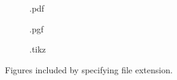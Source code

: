 \begin{figure}
\begin{subfigure}[t]{0.49\textwidth}
        \caption{.pdf}
        \label{figures:fig:exmaple:2:pdf}
        \end{subfigure}
        \begin{subfigure}[t]{0.49\textwidth}
        \caption{.pgf}
        \label{figures:fig:exmaple:2:pgf}
         \end{subfigure} 
        \hfill     
        \begin{subfigure}[t]{0.49\textwidth}
        \caption{.tikz}
        \label{figures:fig:exmaple:2:tikz}
        \end{subfigure}     
        \caption{Figures included by specifying file extension.}   
        \label{figures:fig:example:2}
    \end{figure}
